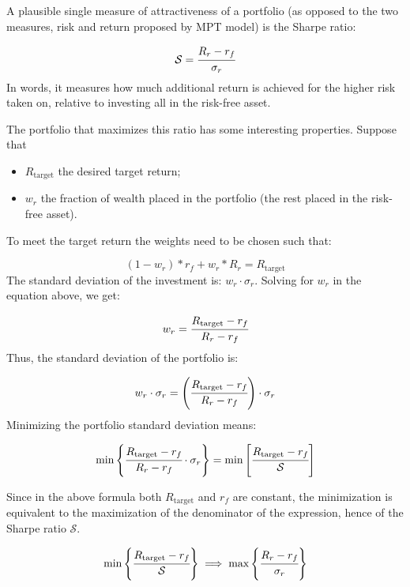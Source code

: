 A plausible single measure of attractiveness of a portfolio (as opposed to the two measures, risk and return proposed by MPT model) is the Sharpe ratio:

\begin{equation} 
\mathcal{S} = \cfrac{R_r - r_f}{\sigma_r} 
\end{equation}
\noindent
In words, it measures how much additional return is achieved for the higher risk taken on, relative to investing all in the risk-free asset. 

The portfolio that maximizes this ratio has some interesting properties. Suppose that

\begin{itemize}
\tightlist
\item
  \(R_\textrm{target}\) the desired target return;
\item
  \(w_r\) the fraction of wealth placed in the portfolio (the rest placed in the risk-free asset).
\end{itemize}
\noindent
To meet the target return the weights need to be chosen such that:

\begin{equation*} 
(1 - w_r) * r_f + w_r * R_r =R_\textrm{target} 
\end{equation*}
\noindent
The standard deviation of the investment is: \(w_r\cdot \sigma_r\). Solving for \(w_r\) in the equation above, we get:

\begin{equation*} 
	w_r = \cfrac{R_\textrm{target} - r_f}{R_r - r_f} 
\end{equation*}
Thus, the standard deviation of the portfolio is:

\begin{equation*} 
w_r\cdot \sigma_r = \left(\cfrac{R_\textrm{target} - r_f}{R_r - r_f}\right)\cdot \sigma_r 
\end{equation*}
Minimizing the portfolio standard deviation means:

\begin{equation} 
\textrm{min}\left\{\cfrac{R_\textrm{target} - r_f}{R_r - r_f}\cdot \sigma_r\right\} = \textrm{min}\left[\cfrac{R_\textrm{target} - r_f}{\mathcal{S}}\right]
\end{equation}

Since in the above formula both $R_{\textrm{target}}$ and $r_f$ are constant, the minimization is equivalent to the maximization of the denominator of the expression, hence of the Sharpe ratio $\mathcal{S}$.

\begin{equation} 
\textrm{min}\left\{\cfrac{R_\textrm{target} - r_f}{\mathcal{S}}\right\}
\implies\textrm{max}\left\{\cfrac{R_r - r_f}{\sigma_r}\right\}
\end{equation}

